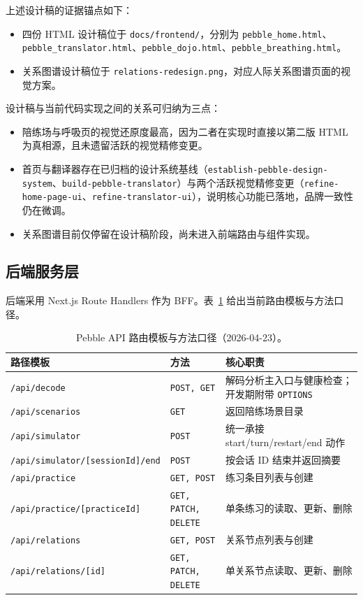 上述设计稿的证据锚点如下：

\begin{itemize}
  \item 四份 HTML 设计稿位于 \texttt{docs/frontend/}，分别为 \texttt{pebble\_home.html}、\texttt{pebble\_translator.html}、\texttt{pebble\_dojo.html}、\texttt{pebble\_breathing.html}。
  \item 关系图谱设计稿位于 \texttt{relations-redesign.png}，对应人际关系图谱页面的视觉方案。
\end{itemize}

设计稿与当前代码实现之间的关系可归纳为三点：

\begin{itemize}
  \item 陪练场与呼吸页的视觉还原度最高，因为二者在实现时直接以第二版 HTML 为真相源，且未遗留活跃的视觉精修变更。
  \item 首页与翻译器存在已归档的设计系统基线（\texttt{establish-pebble-design-system}、\texttt{build-pebble-translator}）与两个活跃视觉精修变更（\texttt{refine-home-page-ui}、\texttt{refine-translator-ui}），说明核心功能已落地，品牌一致性仍在微调。
  \item 关系图谱目前仅停留在设计稿阶段，尚未进入前端路由与组件实现。
\end{itemize}

\subsection{后端服务层}

后端采用 Next.js Route Handlers 作为 BFF。表~\ref{tab:pebble-api-routes} 给出当前路由模板与方法口径。

\begin{table}[H]
  \centering
  \caption{Pebble API 路由模板与方法口径（2026-04-23）。}
  \label{tab:pebble-api-routes}
  \begin{tabularx}{\textwidth}{>{\raggedright\arraybackslash}p{4.1cm} >{\raggedright\arraybackslash}p{2.2cm} >{\raggedright\arraybackslash}X}
    \toprule
    路径模板 & 方法 & 核心职责 \\
    \midrule
    \texttt{/api/decode} & \texttt{POST, GET} & 解码分析主入口与健康检查；开发期附带 \texttt{OPTIONS} \\
    \texttt{/api/scenarios} & \texttt{GET} & 返回陪练场景目录 \\
    \texttt{/api/simulator} & \texttt{POST} & 统一承接 start/turn/restart/end 动作 \\
    \texttt{/api/simulator/[sessionId]/end} & \texttt{POST} & 按会话 ID 结束并返回摘要 \\
    \texttt{/api/practice} & \texttt{GET, POST} & 练习条目列表与创建 \\
    \texttt{/api/practice/[practiceId]} & \texttt{GET, PATCH, DELETE} & 单条练习的读取、更新、删除 \\
    \texttt{/api/relations} & \texttt{GET, POST} & 关系节点列表与创建 \\
    \texttt{/api/relations/[id]} & \texttt{GET, PATCH, DELETE} & 单关系节点读取、更新、删除 \\
    \bottomrule
  \end{tabularx}
\end{table}

